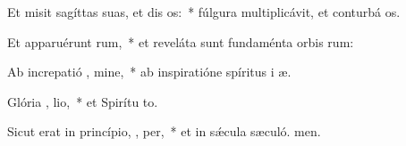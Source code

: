 \item Et misit sagíttas suas, et dis os:~* fúlgura multiplicávit, et conturbá os.
\item Et apparuérunt  rum,~* et reveláta sunt fundaménta orbis rum:
\item Ab increpatió , mine,~* ab inspiratióne spíritus i æ.
\item Glória ,  lio,~* et Spirítu to.
\item Sicut erat in princípio,  ,  per,~* et in sǽcula sæculó. men.
